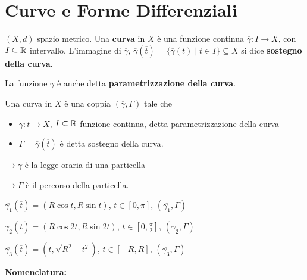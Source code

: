 \section{Curve e Forme Differenziali}

\begin{definition}
	$(X,d)$ spazio metrico. Una \textbf{curva} in $X$ è una funzione continua $\overline{\gamma}:I \rightarrow X$, con $I \subseteq \mathbb{R}$ intervallo. L'immagine di $\overline{\gamma}$, $\overline{\gamma}(\overline{t})=\{\overline{\gamma}(t)\mid t \in I \}\subseteq X$ si dice \textbf{sostegno della curva}.
		
	La funzione $\overline{\gamma}$ è anche detta \textbf{parametrizzazione della curva}.
	
	Una curva in $X$ è una coppia $(\overline{\gamma},\Gamma)$ tale che
	\begin{itemize}
		\item $\overline{\gamma}:\overline{t}\rightarrow X$, $I \subseteq \mathbb{R}$ funzione continua, detta parametrizzazione della curva
		\item $\Gamma=\overline{\gamma}(\overline{t})$ è detta sostegno della curva.
	\end{itemize}
	
	{\color{blue} 
		$\rightarrow \overline{\gamma}$ è la legge oraria di una particella
		
		$\rightarrow \Gamma$ è il percorso della particella.}
\end{definition}


\begin{exbar}
	
	$\overline{\gamma_1}(\overline{t})=(R\cos t , R\sin t)$, $t \in [0,\pi]$, $(\overline{\gamma_1},\Gamma)$
	
	$\overline{\gamma_2}(\overline{t})=(R\cos 2t, R\sin 2t)$, $t \in [0,\frac{\pi}{2}]$, $(\overline{\gamma_2},\Gamma)$
	
	$\overline{\gamma_3}(\overline{t})=(t, \sqrt{R^2-t^2})$, $t \in [-R,R]$, $(\overline{\gamma_3},\Gamma)$
\end{exbar}



\textbf{Nomenclatura:}

